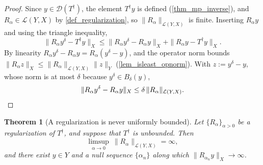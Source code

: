 \documentclass[a4paper]{report}
\theoremstyle{plain}
\newtheorem{theorem}{Theorem}[chapter]
\theoremstyle{definition}
\theoremstyle{remark}
\newcommand{\Ll}{\mathcal{L}}
\newcommand{\Dom}{\mathcal{D}}
\newcommand{\dg}{^{\dagger}}
\begin{document}
\begin{proof}
  Since $y \in \Dom(T\dg)$, the element $T\dg y$ is defined (\cref{thm_mp_inverse}), and
  $R_{\alpha} \in \Ll(Y,X)$ by \cref{def_regularization}, so
  $\|R_{\alpha}\|_{\Ll(Y,X)}$ is finite.  Inserting $R_{\alpha}y$ and using the triangle
  inequality,
  \[
    \|R_{\alpha}y^{\delta} - T\dg y\|_X
      \le \|R_{\alpha}y^{\delta} - R_{\alpha}y\|_X + \|R_{\alpha}y - T\dg y\|_X .
  \]
  By linearity $R_{\alpha}y^{\delta} - R_{\alpha}y = R_{\alpha}(y^{\delta} - y)$, and the
  operator norm bounds $\|R_{\alpha}z\|_X \le \|R_{\alpha}\|_{\Ll(Y,X)}\|z\|_Y$
  (\cref{lem_isleast_opnorm}).  With $z := y^{\delta} - y$, whose norm is at most $\delta$
  because $y^{\delta} \in B_{\delta}(y)$,
  \[
    \|R_{\alpha}y^{\delta} - R_{\alpha}y\|_X \le \delta\,\|R_{\alpha}\|_{\Ll(Y,X)} .
      \qedhere
  \]
\end{proof}


\begin{theorem}[A regularization is never uniformly bounded]
  \label{thm_reg_not_uniformly_bounded}
  Let $\{R_{\alpha}\}_{\alpha>0}$ be a regularization of $T\dg$, and suppose that
  $T\dg$ is unbounded.  Then
  \[
    \limsup_{\alpha \to 0}\ \|R_{\alpha}\|_{\Ll(Y,X)} = \infty ,
  \]
  and there exist $y \in Y$ and a null sequence $\{\alpha_n\}$ along which
  $\|R_{\alpha_n} y\|_X \to \infty$.
\end{theorem}
\end{document}
